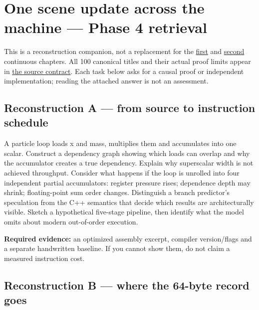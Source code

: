 \hypertarget{appendix-2587680a4fe3}{}\label{referencestart:appendix-2587680a4fe3}
\section{One scene update across the machine --- Phase 4 retrieval}\label{appendix-2587680a4fe3-one-scene-update-across-the-machine-phase-4-retrieval}

This is a reconstruction companion, not a replacement for the \hyperref[01-foundations-i-ch007-from-a-correct-c-asset-service-to-the-instructions-a-cpu-can-execute-phase-4-m019m021-parts-301346]{first} and \hyperref[01-foundations-i-ch007-from-temporary-memory-to-finished-parallel-frames-phase-4-m022m024-parts-347400]{second} continuous chapters. All 100 canonical titles and their actual proof limits appear in \hyperref[appendix-fd090d982a15-phase-4-cpu-architecture-and-measured-execution-parts-301400]{the source contract}. Each task below asks for a causal proof or independent implementation; reading the attached answer is not an assessment.

\subsection{Reconstruction A --- from source to instruction schedule}\label{appendix-2587680a4fe3-reconstruction-a-from-source-to-instruction-schedule}

A particle loop loads x and mass, multiplies them and accumulates into one scalar. Construct a dependency graph showing which loads can overlap and why the accumulator creates a true dependency. Explain why superscalar width is not achieved throughput. Consider what happens if the loop is unrolled into four independent partial accumulators: register pressure rises; dependence depth may shrink; floating-point sum order changes. Distinguish a branch predictor's speculation from the C++ semantics that decide which results are architecturally visible. Sketch a hypothetical five-stage pipeline, then identify what the model omits about modern out-of-order execution.

\textbf{Required evidence:} an optimized assembly excerpt, compiler version/flags and a separate handwritten baseline. If you cannot show them, do not claim a measured instruction cost.

\subsection{Reconstruction B --- where the 64-byte record goes}\label{appendix-2587680a4fe3-reconstruction-b-where-the-64-byte-record-goes}

